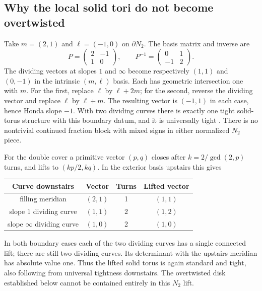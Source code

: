 \documentclass[12pt]{amsart}
\theoremstyle{definition}
\theoremstyle{remark}
\numberwithin{equation}{section}
\theoremstyle{definition}
\begin{document}
\subsection{Why the local solid tori do not become overtwisted}
Take $m=(2,1)$ and $\ell=(-1,0)$ on $\partial N_2$. The basis matrix and inverse are
\begin{equation}\label{en-basis}
P=\begin{pmatrix}2&-1\\1&0\end{pmatrix},\qquad
P^{-1}=\begin{pmatrix}0&1\\-1&2\end{pmatrix}.
\end{equation}
The dividing vectors at slopes $1$ and $\infty$ become respectively $(1,1)$ and $(0,-1)$ in the intrinsic $(m,\ell)$ basis. Each has geometric intersection one with $m$. For the first, replace $\ell$ by $\ell+2m$; for the second, reverse the dividing vector and replace $\ell$ by $\ell+m$. The resulting vector is $(-1,1)$ in each case, hence Honda slope $-1$. With two dividing curves there is exactly one tight solid-torus structure with this boundary datum, and it is universally tight \cite[Proposition 5.1(2), the $s=-1$ case]{en-Honda}. There is no nontrivial continued fraction block with mixed signs in either normalized $N_2$ piece.

For the double cover a primitive vector $(p,q)$ closes after $k=2/\gcd(2,p)$ turns, and lifts to $(kp/2,kq)$. In the exterior basis upstairs this gives
\begin{center}
\begin{tabular}{cccc}\toprule
Curve downstairs & Vector & Turns & Lifted vector\\\midrule
filling meridian & $(2,1)$ & 1 & $(1,1)$\\
slope $1$ dividing curve & $(1,1)$ & 2 & $(1,2)$\\
slope $\infty$ dividing curve & $(1,0)$ & 2 & $(1,0)$\\\bottomrule
\end{tabular}
\end{center}
In both boundary cases each of the two dividing curves has a single connected lift; there are still two dividing curves. Its determinant with the upstairs meridian has absolute value one. Thus the lifted solid torus is again standard and tight, also following from universal tightness downstairs. The overtwisted disk established below cannot be contained entirely in this $N_2$ lift.
\end{document}
